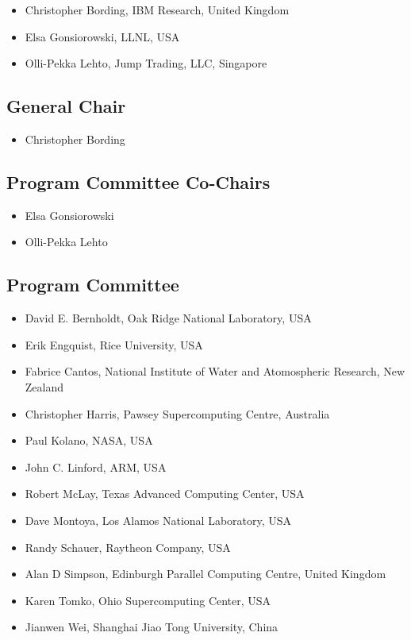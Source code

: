 \documentclass[11pt,a4paper]{article}
\begin{document}
\begin{itemize}
\item Christopher Bording, IBM Research, United Kingdom 
\item Elsa Gonsiorowski, LLNL, USA
\item Olli-Pekka Lehto, Jump Trading, LLC, Singapore
\end{itemize}

\subsection{General Chair}
\begin{itemize}
\item Christopher Bording
\end{itemize}
\subsection{Program Committee Co-Chairs}

\begin{itemize}
\item Elsa Gonsiorowski
\item Olli-Pekka Lehto
\end{itemize}

\subsection{Program Committee}

\begin{itemize}
\item David E. Bernholdt, Oak Ridge National Laboratory, USA
\item Erik Engquist, Rice University, USA
\item Fabrice Cantos, National Institute of Water and Atomospheric Research, New Zealand
\item Christopher Harris, Pawsey Supercomputing Centre, Australia
\item Paul Kolano, NASA, USA
\item John C. Linford, ARM, USA
\item Robert McLay, Texas Advanced Computing Center, USA
\item Dave Montoya, Los Alamos National Laboratory, USA
\item Randy Schauer, Raytheon Company, USA
\item Alan D Simpson, Edinburgh Parallel Computing Centre, United Kingdom
\item Karen Tomko, Ohio Supercomputing Center, USA
\item Jianwen Wei, Shanghai Jiao Tong University, China
\end{itemize}
\end{document}
